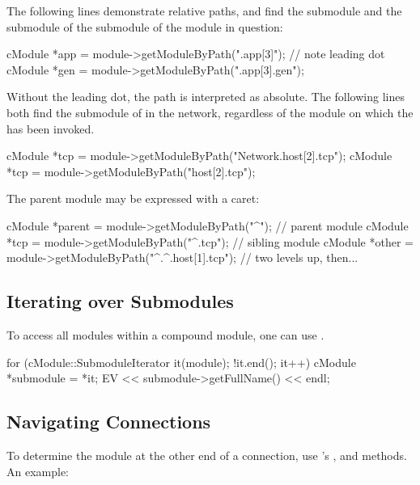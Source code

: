 \begin{ned}
The following lines demonstrate relative paths, and find the 
submodule and the  submodule of the  submodule of the
module in question:

\begin{cpp}
cModule *app = module->getModuleByPath(".app[3]");  // note leading dot
cModule *gen = module->getModuleByPath(".app[3].gen");
\end{cpp}

Without the leading dot, the path is interpreted as absolute. The following
lines both find the  submodule of  in the network,
regardless of the module on which the  has been
invoked.

\begin{cpp}
cModule *tcp = module->getModuleByPath("Network.host[2].tcp");
cModule *tcp = module->getModuleByPath("host[2].tcp");
\end{cpp}

The parent module may be expressed with a caret:

\begin{cpp}
cModule *parent = module->getModuleByPath("^"); // parent module
cModule *tcp = module->getModuleByPath("^.tcp"); // sibling module
cModule *other = module->getModuleByPath("^.^.host[1].tcp"); // two levels up, then...
\end{cpp}


\subsection{Iterating over Submodules}
\label{sec:simple-modules:iterating-over-submodules}

To access all modules within a compound module,
one can use .

\begin{cpp}
for (cModule::SubmoduleIterator it(module); !it.end(); it++) {
    cModule *submodule = *it;
    EV << submodule->getFullName() << endl;
}
\end{cpp}


\subsection{Navigating Connections}
\label{sec:simple-modules:navigating-connections}

To determine the module at the other end of a connection, use
's ,  and
 methods. An example:


\end{ned}
